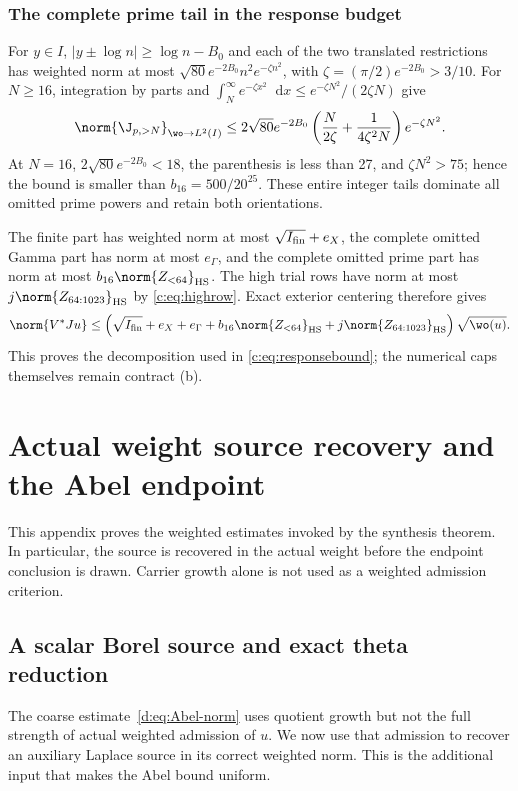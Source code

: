\documentclass[11pt,a4paper]{article}
\numberwithin{equation}{section}
\theoremstyle{definition}\newtheorem{definition}[theorem]{Definition}
\theoremstyle{remark}\newtheorem{remark}[theorem]{Remark}
\newcommand{\dd}{\mathop{}\!\mathrm d}\newcommand{\one}{\mathbf1}
\begin{document}
\subsubsection{The complete prime tail in the response budget}
For $y\in I$, $|y\pm\log n|\ge\log n-{B_0}$ and each of the two
translated restrictions has weighted norm at most
$\sqrt{80}e^{-2{B_0}}n^2e^{-\zeta n^2}$, with
$\zeta=(\pi/2)e^{-2{B_0}}>3/10$. For $N\ge16$, integration by parts and
$\int_N^\infty e^{-\zeta x^2}\dd x\le
 e^{-\zeta N^2}/(2\zeta N)$ give
\[
 \norm{\J_{p,>N}}_{\wo\to L^2(I)}
 \le2\sqrt{80}e^{-2{B_0}}
 \left(\frac{N}{2\zeta}+\frac1{4\zeta^2N}\right)e^{-\zeta N^2}.
\]
At $N=16$, $2\sqrt{80}e^{-2{B_0}}<18$, the parenthesis is less than 27,
and $\zeta N^2>75$; hence the bound is smaller than
$b_{16}=500/20^{25}$. These entire integer tails dominate all omitted
prime powers and retain both orientations.


The finite part has weighted norm at most $\sqrt{I_{\rm fin}}+e_X$,
the complete omitted Gamma part has norm at most $e_\Gamma$,
and the complete omitted prime part has norm at most
$b_{16}\norm{Z_{<64}}_{\mathrm{HS}}$.
The high trial rows have norm at most $j\norm{Z_{64:1023}}_{\mathrm{HS}}$ by
\eqref{c:eq:highrow}. Exact exterior centering therefore gives
\[
 \norm{V^*Ju}\le
 \left(\sqrt{I_{\rm fin}}+e_X+e_\Gamma+
 b_{16}\norm{Z_{<64}}_{\mathrm{HS}}
 +j\norm{Z_{64:1023}}_{\mathrm{HS}}\right)\sqrt{\wo(u)}.
\]
This proves the decomposition used in \eqref{c:eq:responsebound};
the numerical caps themselves remain contract (b).


\section{Actual weight source recovery and the Abel endpoint}\label{app:abel}
This appendix proves the weighted estimates invoked by the synthesis theorem. In particular, the source is recovered in the actual weight before the endpoint conclusion is drawn. Carrier growth alone is not used as a weighted admission criterion.


\subsection{A scalar Borel source and exact theta reduction}\label{d:sec:scalar-source}

The coarse estimate~\eqref{d:eq:Abel-norm} uses quotient growth but not the full strength of actual weighted admission of $u$. We now use that admission to recover an auxiliary Laplace source in its correct weighted norm. This is the additional input that makes the Abel bound uniform.
\end{document}
